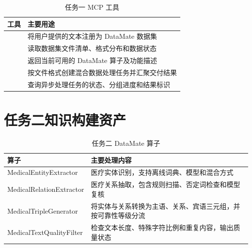 \begin{table}[H]
\centering
\small
\setlength{\tabcolsep}{4pt}
\caption{任务一 MCP 工具}
\label{tab:assets-task1-tools}
\begin{tabularx}{\textwidth}{L{4.5cm}Y}
\toprule
\textbf{工具} & \textbf{主要用途} \\
\midrule
{} & 将用户提供的文本注册为 DataMate 数据集 \\
 & 读取数据集文件清单、格式分布和数据状态 \\
 & 返回当前可用的 DataMate 算子及功能描述 \\
 & 按文件格式创建混合数据处理任务并汇聚交付结果 \\
 & 查询异步处理任务的状态、分组进度和结果标识 \\
\bottomrule
\end{tabularx}
\end{table}

\section{任务二知识构建资产}

\begin{table}[H]
\centering
\small
\setlength{\tabcolsep}{4pt}
\caption{任务二 DataMate 算子}
\label{tab:assets-task2-operators}
\begin{tabularx}{\textwidth}{L{4.5cm}Y}
\toprule
\textbf{算子} & \textbf{主要处理内容} \\
\midrule
MedicalEntityExtractor & 医疗实体识别，支持离线词典、模型和混合方式 \\
MedicalRelationExtractor & 医疗关系抽取，包含规则扫描、否定词检查和模型复核 \\
MedicalTripleGenerator & 将实体与关系转换为主语、关系、宾语三元组，并按可靠性等级分流 \\
MedicalTextQualityFilter & 检查文本长度、特殊字符比例和重复内容，输出质量状态 \\
\bottomrule
\end{tabularx}
\end{table}

